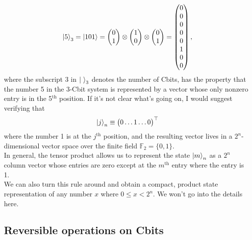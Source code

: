 \documentclass{book}
\theoremstyle{definition}
\begin{document}
\begin{align}
\ket{5}_3 = \ket{101} = 
\begin{pmatrix}
0\\1
\end{pmatrix}\otimes
\begin{pmatrix}
1\\0
\end{pmatrix}\otimes
\begin{pmatrix}
0\\1
\end{pmatrix}
=
\begin{pmatrix}
0\\0\\0\\0\\0\\1\\0\\0
\end{pmatrix},
\end{align}
where the subscript 3 in $\ket{\,\,}_3$ denotes the number of Cbits, has the property that the number 5 in the 3-Cbit system is represented by a vector whose only nonzero entry is in the 5$^{\text{th}}$ position. If it's not clear what's going on, I would suggest verifying that 
\begin{align}
\ket{j}_n \equiv \begin{pmatrix}
0\dots 1 \dots 0
\end{pmatrix}^\top 
\end{align}
where the number 1 is at the $j^\text{th}$ position, and the resulting vector lives in a $2^n$-dimensional vector space over the finite field $\mathbb{F}_2 = \{0,1\}$. \\

In general, the tensor product allows us to represent the state $\ket{m}_n$ as a $2^n$ column vector whose entries are zero except at the $m^{\text{th}}$ entry where the entry is 1. \\

We can also turn this rule around and obtain a compact, product state representation of any number $x$ where $0 \leq x < 2^n$. We won't go into the details here. 









\subsection{Reversible operations on Cbits}
\end{document}
